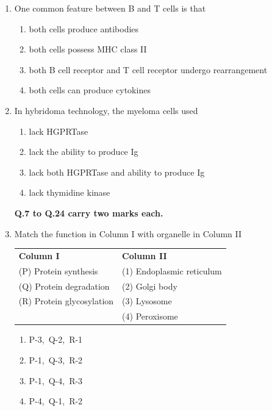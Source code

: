 \documentclass[journal,12pt,onecolumn]{IEEEtran}
\begin{document}
\begin{enumerate}
\item One common feature between B and T cells is that
\begin{multicols}{2}
\begin{enumerate}[label=(\Alph*)]
\item both cells produce antibodies
\item both cells possess MHC class II
\item both B cell receptor and T cell receptor undergo rearrangement
\item both cells can produce cytokines
\end{enumerate}
\end{multicols}

\item In hybridoma technology, the myeloma cells used
\begin{multicols}{2}
\begin{enumerate}[label=(\Alph*)]
\item lack HGPRTase
\item lack the ability to produce Ig
\item lack both HGPRTase and ability to produce Ig
\item lack thymidine kinase
\end{enumerate}
\end{multicols}


\noindent \textbf{Q.7 to Q.24 carry two marks each.}


\item Match the function in Column I with organelle in Column II

\noindent
\begin{tabular}{p{6cm} p{6cm}}
\textbf{Column I} & \textbf{Column II} \\
(P) Protein synthesis & (1) Endoplasmic reticulum \\
(Q) Protein degradation & (2) Golgi body \\
(R) Protein glycosylation & (3) Lysosome \\
& (4) Peroxisome
\end{tabular}

\begin{multicols}{2}
\begin{enumerate}[label=(\Alph*)]
\item P-3,\ Q-2,\ R-1
\item  P-1,\ Q-3,\ R-2
\item   P-1,\ Q-4,\ R-3
\item    P-4,\ Q-1,\ R-2
\end{enumerate}
\end{multicols}


\end{enumerate}
\end{document}
